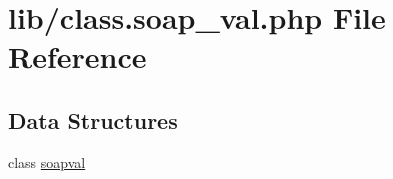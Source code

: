 \hypertarget{class_8soap__val_8php}{}\section{lib/class.soap\+\_\+val.\+php File Reference}
\label{class_8soap__val_8php}
\subsection*{Data Structures}
\begin{DoxyCompactItemize}
\item 
class \hyperlink{classsoapval}{soapval}
\end{DoxyCompactItemize}
